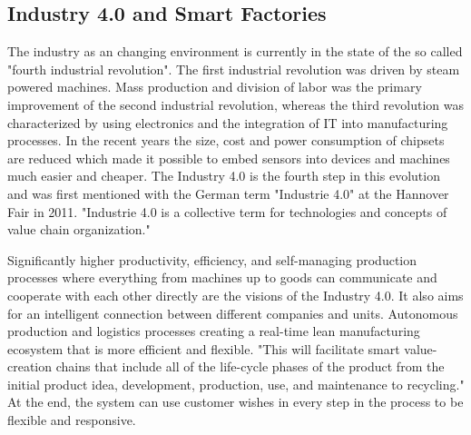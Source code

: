 \subsection{Industry 4.0 and Smart Factories}
The industry as an changing environment is currently in the state of the so called "fourth industrial revolution".
The first industrial revolution was driven by steam powered machines.
Mass production and division of labor was the primary improvement of the second industrial revolution, whereas the third revolution was characterized by using electronics and the integration of \ac{IT} into manufacturing processes.\cite[cf.][p. 1]{Lom:2016}
In the recent years the size, cost and power consumption of chipsets are reduced which made it possible to embed sensors into devices and machines much easier and cheaper.\cite[cf.][p. 1]{Brito2016}
The Industry 4.0 is the fourth step in this evolution and was first mentioned with the German term "Industrie 4.0" at the Hannover Fair in 2011.\cite[cf.][p. 1]{Lom:2016}
"Industrie 4.0 is a collective term for technologies and concepts of value chain organization."\cite[cf.][p. 11]{Her2015}

Significantly higher productivity, efficiency, and self-managing production processes where everything from machines up to goods can communicate and cooperate with each other directly are the visions of the Industry 4.0.\cite[cf.]{Lyd2016}
It also aims for an intelligent connection between different companies and units.
Autonomous production and logistics processes creating a real-time lean manufacturing ecosystem that is more efficient and flexible.\cite[cf.]{Lyd2016}
"This will facilitate smart value-creation chains that include all of the life-cycle phases of the product from the initial product idea, development, production, use, and maintenance to recycling."\cite{Lyd2016}
At the end, the system can use customer wishes in every step in the process to be flexible and responsive.\cite[cf.]{Lyd2016}

